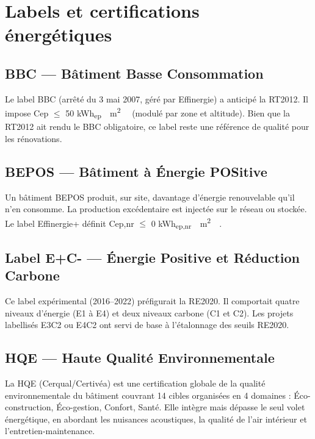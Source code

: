 \section{Labels et certifications énergétiques}

\subsection{BBC — Bâtiment Basse Consommation}

Le label BBC (arrêté du 3 mai 2007, géré par Effinergie) a anticipé la RT2012. Il impose Cep $\leq$ 50 \si{\kWh_{ep} \per \m^2 \per \year} (modulé par zone et altitude). Bien que la RT2012 ait rendu le BBC obligatoire, ce label reste une référence de qualité pour les rénovations.

\subsection{BEPOS — Bâtiment à Énergie POSitive}

\begin{definition}[title=BEPOS — Bâtiment à Énergie Positive]
Un bâtiment BEPOS produit, sur site, davantage d'énergie renouvelable qu'il n'en consomme. La production excédentaire est injectée sur le réseau ou stockée. Le label Effinergie+ définit Cep,nr $\leq$ 0 \si{\kWh_{ep,nr} \per \m^2 \per \year}.
\end{definition}

\subsection{Label E+C- — Énergie Positive et Réduction Carbone}

Ce label expérimental (2016--2022) préfigurait la RE2020. Il comportait quatre niveaux d'énergie (E1 à E4) et deux niveaux carbone (C1 et C2). Les projets labellisés E3C2 ou E4C2 ont servi de base à l'étalonnage des seuils RE2020.

\subsection{HQE — Haute Qualité Environnementale}

\begin{definition}[title=Certification HQE]
La HQE (Cerqual/Certivéa) est une certification globale de la qualité environnementale du bâtiment couvrant 14 cibles organisées en 4 domaines : Éco-construction, Éco-gestion, Confort, Santé. Elle intègre mais dépasse le seul volet énergétique, en abordant les nuisances acoustiques, la qualité de l'air intérieur et l'entretien-maintenance.
\end{definition}

